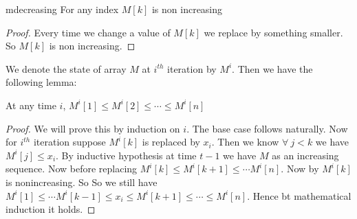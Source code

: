 \begin{lemma}{}{mdecreasing}
	For any index $M[k]$ is non increasing
\end{lemma}
\begin{proof}
	Every time we change a value of $M[k]$ we replace by something smaller. So $M[k]$ is non increasing.
\end{proof}
We denote the state of array $M$ at $i^{th}$ iteration by $M^i$. Then we have the following lemma:

\begin{lemma}{}{}
At any time $i$, $M^i[1]\leq M^i[2]\leq \cdots\leq M^i[n]$
\end{lemma}
\begin{proof}
We will prove this by induction on $i$. The base case follows naturally. Now for $i^{th}$ iteration suppose $M^i[k]$ is replaced by $x_i$. Then we know $\forall \ j<k$ we have $M^i[j]\leq x_i$. By inductive hypothesis at time $t-1$ we have $M$ as an increasing sequence. Now before replacing $M^i[k]\leq M^i[k+1]\leq \cdots M^i[n]$. Now by  $M^i[k]$ is nonincreasing. So  So we still have $M^i[1]\leq \cdots M^i[k-1]\leq x_i\leq M^i[k+1]\leq \cdots \leq M^i[n]$. Hence bt mathematical induction it holds.
\end{proof}

